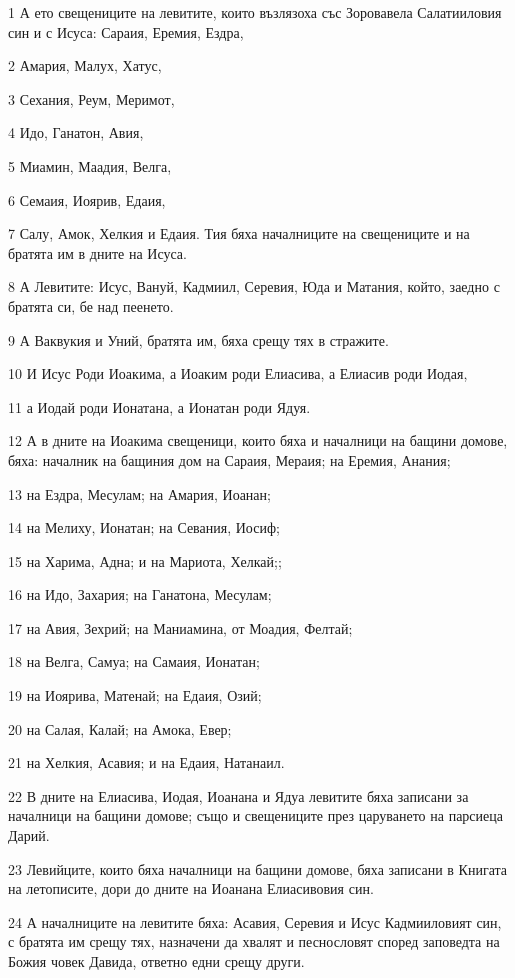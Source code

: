 \par 1 А ето свещениците на левитите, които възлязоха със Зоровавела Салатииловия син и с Исуса: Сараия, Еремия, Ездра,
\par 2 Амария, Малух, Хатус,
\par 3 Сехания, Реум, Меримот,
\par 4 Идо, Ганатон, Авия,
\par 5 Миамин, Маадия, Велга,
\par 6 Семаия, Иоярив, Едаия,
\par 7 Салу, Амок, Хелкия и Едаия. Тия бяха началниците на свещениците и на братята им в дните на Исуса.
\par 8 А Левитите: Исус, Вануй, Кадмиил, Серевия, Юда и Матания, който, заедно с братята си, бе над пеенето.
\par 9 А Ваквукия и Уний, братята им, бяха срещу тях в стражите.
\par 10 И Исус Роди Иоакима, а Иоаким роди Елиасива, а Елиасив роди Иодая,
\par 11 а Иодай роди Ионатана, а Ионатан роди Ядуя.
\par 12 А в дните на Иоакима свещеници, които бяха и началници на бащини домове, бяха: началник на бащиния дом на Сараия, Мераия; на Еремия, Анания;
\par 13 на Ездра, Месулам; на Амария, Иоанан;
\par 14 на Мелиху, Ионатан; на Севания, Иосиф;
\par 15 на Харима, Адна; и на Мариота, Хелкай;;
\par 16 на Идо, Захария; на Ганатона, Месулам;
\par 17 на Авия, Зехрий; на Маниамина, от Моадия, Фелтай;
\par 18 на Велга, Самуа; на Самаия, Ионатан;
\par 19 на Иоярива, Матенай; на Едаия, Озий;
\par 20 на Салая, Калай; на Амока, Евер;
\par 21 на Хелкия, Асавия; и на Едаия, Натанаил.
\par 22 В дните на Елиасива, Иодая, Иоанана и Ядуа левитите бяха записани за началници на бащини домове; също и свещениците през царуването на парсиеца Дарий.
\par 23 Левийците, които бяха началници на бащини домове, бяха записани в Книгата на летописите, дори до дните на Иоанана Елиасивовия син.
\par 24 А началниците на левитите бяха: Асавия, Серевия и Исус Кадмииловият син, с братята им срещу тях, назначени да хвалят и песнословят според заповедта на Божия човек Давида, ответно едни срещу други.
